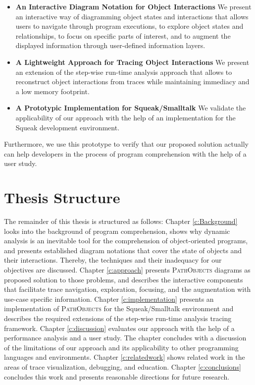 \begin{itemize}
\renewcommand{\labelitemiv}{$\ast$}

\item \textbf{An Interactive Diagram Notation for Object Interactions} We present an interactive way of diagramming object states and interactions that allows users to navigate through program executions, to explore object states and relationships, to focus on specific parts of interest, and to augment the displayed information through user-defined information layers.

\item \textbf{A Lightweight Approach for Tracing Object Interactions} We present an extension of the step-wise run-time analysis approach that allows to reconstruct object interactions from traces while maintaining immediacy and a low memory footprint.

\item \textbf{A Prototypic Implementation for Squeak/Smalltalk} We validate the applicability of our approach with the help of an implementation for the Squeak development environment.
\end{itemize}

Furthermore, we use this prototype to verify that our proposed solution actually can help developers in the process of program comprehension with the help of a user study. 

\section{Thesis Structure}
The remainder of this thesis is structured as follows:
Chapter \ref{c:Background} looks into the background of program comprehension, shows why dynamic analysis is an inevitable tool for the comprehension of object-oriented programs, and presents established diagram notations that cover the state of objects and their interactions.
Thereby, the techniques and their inadequacy for our objectives are discussed.
Chapter \ref{c:approach} presents \textsc{PathObjects} diagrams as proposed solution to those problems, and describes the interactive components that facilitate trace navigation, exploration, focusing, and the augmentation with use-case specific information.
Chapter \ref{c:implementation} presents an implementation of \textsc{PathObjects} for the Squeak/Smalltalk environment and describes the required extensions of the step-wise run-time analysis tracing framework.
Chapter \ref{c:discussion} evaluates our approach with the help of a performance analysis and a user study. 
The chapter concludes with a discussion of the limitations of our approach and its applicability to other programming languages and environments.
Chapter \ref{c:relatedwork} shows related work in the areas of trace visualization, debugging, and education.
Chapter \ref{c:conclusions} concludes this work and presents reasonable directions for future research.